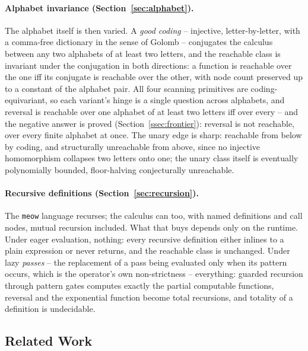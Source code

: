 \documentclass[runningheads,envcountsect]{llncs}
\begin{document}
\paragraph{Alphabet invariance (Section~\ref{sec:alphabet}).} The alphabet itself is then varied. A \emph{good coding} -- injective, letter-by-letter, with a comma-free dictionary in the sense of Golomb -- conjugates the calculus between any two alphabets of at least two letters, and the reachable class is invariant under the conjugation in both directions: a function is reachable over the one iff its conjugate is reachable over the other, with node count preserved up to a constant of the alphabet pair. All four scanning primitives are coding-equivariant, so each variant's hinge is a single question across alphabets, and reversal is reachable over one alphabet of at least two letters iff over every -- and the negative answer is proved (Section~\ref{ssec:frontier}): reversal is not reachable, over every finite alphabet at once. The unary edge is sharp: reachable from below by coding, and structurally unreachable from above, since no injective homomorphism collapses two letters onto one; the unary class itself is eventually polynomially bounded, floor-halving conjecturally unreachable.

\paragraph{Recursive definitions (Section~\ref{sec:recursion}).} The \texttt{meow} language recurses; the calculus can too, with named definitions and call nodes, mutual recursion included. What that buys depends only on the runtime. Under eager evaluation, nothing: every recursive definition either inlines to a plain expression or never returns, and the reachable class is unchanged. Under lazy \emph{passes} -- the replacement of a pass being evaluated only when its pattern occurs, which is the operator's own non-strictness -- everything: guarded recursion through pattern gates computes exactly the partial computable functions, reversal and the exponential function become total recursions, and totality of a definition is undecidable.

\subsection{Related Work}
\end{document}
